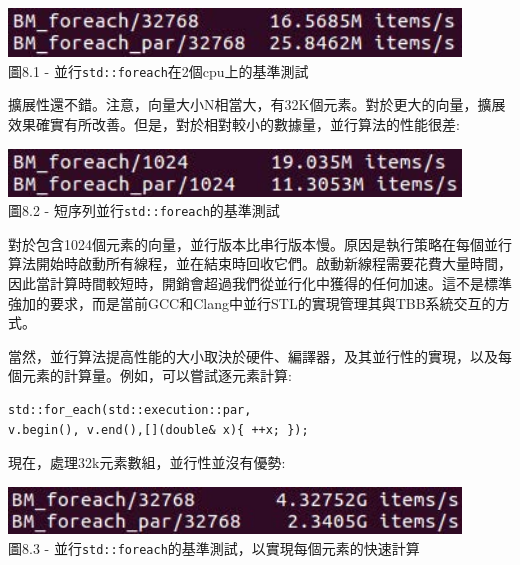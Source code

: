 \begin{center}
\includegraphics[width=0.9\textwidth]{content/2/chapter8/images/1.jpg}\\
圖8.1 - 並行\texttt{std::foreach}在2個cpu上的基準測試
\end{center}

擴展性還不錯。注意，向量大小N相當大，有32K個元素。對於更大的向量，擴展效果確實有所改善。但是，對於相對較小的數據量，並行算法的性能很差:

\begin{center}
\includegraphics[width=0.9\textwidth]{content/2/chapter8/images/2.jpg}\\
圖8.2 - 短序列並行\texttt{std::foreach}的基準測試
\end{center}

對於包含1024個元素的向量，並行版本比串行版本慢。原因是執行策略在每個並行算法開始時啟動所有線程，並在結束時回收它們。啟動新線程需要花費大量時間，因此當計算時間較短時，開銷會超過我們從並行化中獲得的任何加速。這不是標準強加的要求，而是當前GCC和Clang中並行STL的實現管理其與TBB系統交互的方式。 

當然，並行算法提高性能的大小取決於硬件、編譯器，及其並行性的實現，以及每個元素的計算量。例如，可以嘗試逐元素計算:

\begin{lstlisting}[style=styleCXX]
std::for_each(std::execution::par,
v.begin(), v.end(),[](double& x){ ++x; });
\end{lstlisting}

現在，處理32k元素數組，並行性並沒有優勢:

\begin{center}
\includegraphics[width=0.9\textwidth]{content/2/chapter8/images/3.jpg}\\
圖8.3 - 並行\texttt{std::foreach}的基準測試，以實現每個元素的快速計算
\end{center}

